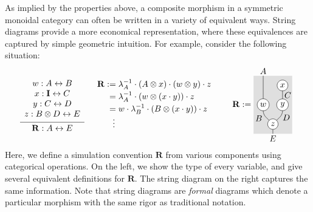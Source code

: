 \documentclass[acmsmall,screen,review,anonymous]{acmart}
\begin{document}
As implied by the properties above,
a composite morphism in a symmetric monoidal category
can often be written in a variety of equivalent ways.
String diagrams provide a more economical representation,
where these equivalences are captured
by simple geometric intuition.
For example, consider the following situation:
\[
  \begin{prooftree}
    \hypo{
      \begin{array}{c}
	w : A \leftrightarrow B \\
	x : \mathbf{I} \leftrightarrow C \\
	y : C \leftrightarrow D \\
	z : B \otimes D \leftrightarrow E
      \end{array}
    }
    \infer1{\mathbf{R} : A \leftrightarrow E}
  \end{prooftree}
  \quad
  \begin{array}{r@{}l}
    \mathbf{R} := {} &
    \lambda_A^{-1} \cdot
    (A \otimes x) \cdot
    (w \otimes y) \cdot
    z 
    \\[0.5ex]
    = {} &
    \lambda_A^{-1} \cdot
    (w \otimes (x \cdot y)) \cdot z
    \\[0.5ex]
    = {} &
    w \cdot \lambda_B^{-1} \cdot
    (B \otimes (x \cdot y)) \cdot z
    \\
    \vdots \:\, &
  \end{array}
  \qquad
  \mathbf{R} :=
  \vcenter{\hbox{%
    \begin{tikzpicture}[scale=0.4,inner sep=2pt,baseline=(w.base)]
      \fill[scsdbg] (-1, 0) rectangle (3, 6);
      \draw[rounded corners]
            (0, 6) node[above] {$A$}
         -- (0, 3) node[draw,fill=white,circle] (w) {$w$}
         -- (0, 2) node[below left,inner sep=1pt] {$B$} -- (1, 1)
         -- (1, 0) node[below] {$E$};
      \draw[rounded corners]
            (2, 5) node[draw,fill=white,circle] {$x$}
         -- node[midway,right] {$C$} (2, 3) node[draw,fill=white,circle] {$y$}
         -- (2, 2) node[below right,inner sep=0pt] {$D$} -- (1, 1) node[draw,fill=white,circle] {$z$};
    \end{tikzpicture}
  }}
\]
Here,
we define a simulation convention $\mathbf{R}$ from various components
using categorical operations.
On the left,
we show the type of every variable,
and give several equivalent definitions for $\mathbf{R}$.
The string diagram on the right
captures the same information.
Note that
string diagrams
are \emph{formal} diagrams
which denote a particular morphism
with the same rigor
as traditional notation.
\end{document}
